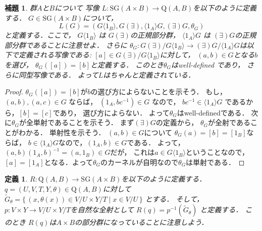 \documentclass[leqno]{jsarticle}
\newtheorem{lem}[thm]{補題}
\newtheorem{df}[thm]{定義}
\newcommand{\myproja}[1]{(\exists)#1}
\newcommand{\myprojb}[1]{#1(\exists)}
\newcommand{\mysliceb}[2]{#1\langle #2\rangle}
\newcommand{\myslicea}[2]{\langle #2\rangle#1}
\newcommand{\myqq}[2]{\mathrm{Q}(#1, #2)}
\newcommand{\mysg}[1]{\mathrm{SG}(#1)}
\newcommand{\mymapl}{L}
\newcommand{\mymapr}{R}
\begin{document}
\begin{lem}
群$A$と$B$について
写像
$\mymapl\colon \mysg{A\times B}\to \myqq{A}{B}$を以下のように定義する．
$G\in \mysg{A\times B}$について，
\[
L(G)=(\mysliceb{G}{1_{B}}, \myprojb{G}, 
\myslicea{G}{1_{A}},  \myproja{G}, \theta_{G})
\]
と定義する．ここで，
$\mysliceb{G}{1_{B}}$
は
$\myprojb{G}$の正規部分群，
$\myslicea{G}{1_{A}}$
は
$\myproja{G}$の正規部分群であることに注意せよ．
さらに
$\theta_{G}\colon \myprojb{G}/\mysliceb{G}{1_{B}}
\to \myproja{G}/\myslicea{G}{1_{A}}$は以下で定義される写像である:
$[a]\in \myprojb{G}/\mysliceb{G}{1_{B}}$に対して，
$(a, b)\in G$となる$b$を選び，
$\theta_G([a])=[b]$と定義する．
このとき$\theta_{G}$はwell-defined であり，
さらに同型写像である．
よって$\mymapl$はちゃんと定義されている．
\end{lem}
\begin{proof}
$\theta_G([a])=[b]$が$b$の選び方によらないことを示そう．
もし，
$(a, b), (a, c)\in G$
ならば，
$(1_A, bc^{-1})\in G$
なので，
$bc^{-1}\in \myslicea{G}{1_{A}}$
であるから，$[b]=[c]$であり，
選び方によらない．
よって$\theta_{G}$はwell-definedである．
次に$\theta_{G}$が全単射であることを示そう．
まず$\myproja{G}$の定義から，
$\theta_{G}$が全射であることがわかる．
単射性を示そう．
$(a, b)\in G$について
$\theta_{G}(a)=[b]=[1_{B}]$ならば，
$b\in \myslicea{G}{1_{A}}$なので，$(1_A, b)\in G$である．
よって，$(a, b)(1_A, b)^{-1}=(a, 1_B)\in G$だが，
これは$a\in \mysliceb{G}{1_{B}}$ということなので，
$[a]=[1_A]$となる．よって$\theta_{G}$のカーネルが自明なので$\theta_{G}$は単射である．
\end{proof}

\begin{df}
$\mymapr\colon \myqq{A}{B}\to \mysg{A\times B}$を以下のように定義する．
$q=(U, V, T, Y, \theta)\in \myqq{A}{B}$に対して
$\widetilde{G}_{\theta}=\{\, (x, \theta(x))\in V/U\times Y/T \mid x\in V/U\, \}$
とする．
そして，
$p\colon V\times Y\to V/U\times Y/T$を自然な全射として
$\mymapr(q)=p^{-1}\left(\widetilde{G}_{\theta}\right)$
と定義する．
このとき
$\mymapr(q)$は$A\times B$の部分群になっていることに注意しよう．
\end{df}
\end{document}
